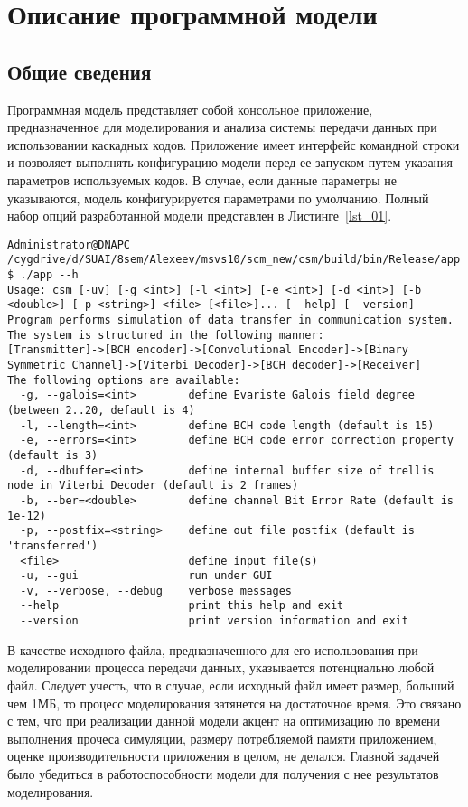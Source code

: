 \chapter{Описание программной модели}
\section{Общие сведения}
Программная модель представляет собой консольное приложение, предназначенное для моделирования и анализа 
системы передачи данных при использовании каскадных кодов. Приложение имеет интерфейс командной строки и 
позволяет выполнять конфигурацию модели перед ее запуском путем указания параметров используемых кодов. В 
случае, если данные параметры не указываются, модель конфигурируется параметрами по умолчанию. Полный набор 
опций разработанной модели представлен в Листинге~\ref{lst_01}.

\begin{lstlisting}[caption={Вывод информации о доступных опциях}, label={lst_01}]
Administrator@DNAPC /cygdrive/d/SUAI/8sem/Alexeev/msvs10/scm_new/csm/build/bin/Release/app
$ ./app --h
Usage: csm [-uv] [-g <int>] [-l <int>] [-e <int>] [-d <int>] [-b <double>] [-p <string>] <file> [<file>]... [--help] [--version]
Program performs simulation of data transfer in communication system. The system is structured in the following manner:
[Transmitter]->[BCH encoder]->[Convolutional Encoder]->[Binary Symmetric Channel]->[Viterbi Decoder]->[BCH decoder]->[Receiver]
The following options are available:
  -g, --galois=<int>        define Evariste Galois field degree (between 2..20, default is 4)
  -l, --length=<int>        define BCH code length (default is 15)
  -e, --errors=<int>        define BCH code error correction property (default is 3)
  -d, --dbuffer=<int>       define internal buffer size of trellis node in Viterbi Decoder (default is 2 frames)
  -b, --ber=<double>        define channel Bit Error Rate (default is 1e-12)
  -p, --postfix=<string>    define out file postfix (default is 'transferred')
  <file>                    define input file(s)
  -u, --gui                 run under GUI
  -v, --verbose, --debug    verbose messages
  --help                    print this help and exit
  --version                 print version information and exit
\end{lstlisting}

В качестве исходного файла, предназначенного для его использования при моделировании процесса передачи 
данных, указывается потенциально любой файл. Следует учесть, что в случае, если исходный файл имеет размер, 
больший чем 1МБ, то процесс моделирования затянется на достаточное время. Это связано с тем, что при 
реализации данной модели акцент на оптимизацию по времени выполнения прочеса симуляции, размеру потребляемой 
памяти приложением, оценке производительности приложения в целом, не делался. Главной задачей было убедиться 
в работоспособности модели для получения с нее результатов моделирования.

